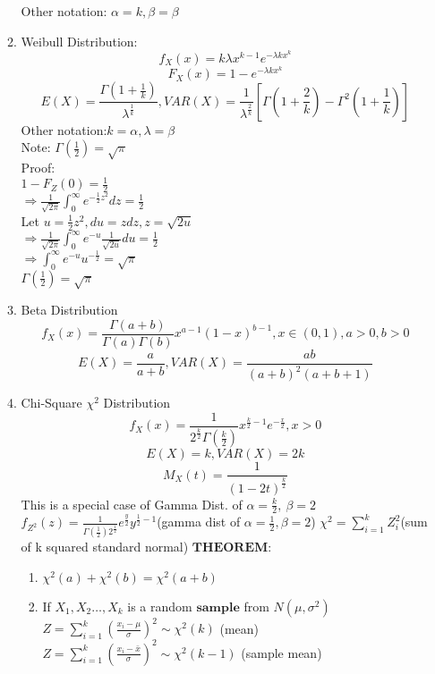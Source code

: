 \documentclass[10pt]{article}
\begin{document}
\begin{multicols}{2}
\begin{enumerate}
\begin{enumerate}
				Other notation: $\alpha = k, \beta = \beta$
				\item Weibull Distribution:\\
				$$f_X(x) = k\lambda x^{k-1}e^{-\lambda kx^k}$$
				$$F_X(x) = 1 - e^{-\lambda kx^k}$$
				$$E(X) = \frac{\Gamma(1+\frac{1}{k})}{\lambda^{\frac{1}{k}}}, VAR(X) = \frac{1}{\lambda^{\frac{2}{k}}}[\Gamma(1+\frac{2}{k}) - \Gamma^2(1+\frac{1}{k})]$$
				Other notation:$k = \alpha, \lambda = \beta$\\
				Note: $\Gamma(\frac{1}{2}) = \sqrt{\pi}$\\
				Proof:\\
				$1 - F_Z(0) = \frac{1}{2}$\\
				$\Rightarrow \frac{1}{\sqrt{2\pi}}\int_{0}^{\infty}e^{-\frac{1}{2}z^2}dz = \frac{1}{2}$\\
				Let $u = \frac{1}{2}z^2, du = zdz, z = \sqrt{2u}$\\
				$\Rightarrow \frac{1}{\sqrt{2\pi}}\int_{0}^{\infty}e^{-u}\frac{1}{\sqrt{2u}}du = \frac{1}{2}$\\
				$\Rightarrow \int_{0}^{\infty}e^{-u}u^{-\frac{1}{2}} = \sqrt{\pi}$\\
				$\Gamma(\frac{1}{2}) = \sqrt{\pi}$
				\item Beta Distribution
				$$f_X(x) = \frac{\Gamma(a + b)}{\Gamma(a)\Gamma(b)}x^{a-1}(1-x)^{b-1}, x \in (0,1), a>0, b>0$$
				$$E(X) = \frac{a}{a+b}, VAR(X) = \frac{ab}{(a+b)^2(a+b+1)}$$
				\item Chi-Square $\chi^2$ Distribution
				$$f_X(x) = \frac{1}{2^{\frac{k}{2}}\Gamma(\frac{k}{2})}x^{\frac{k}{2}-1}e^{-\frac{x}{2}}, x > 0$$
				$$E(X) = k, VAR(X) = 2k$$
				$$M_X(t) = \frac{1}{(1-2t)^{\frac{k}{2}}}$$
				This is a special case of Gamma Dist. of $\alpha = \frac{k}{2}, \ \beta = 2$\\
				$f_{Z^2}(z) = \frac{1}{\Gamma(\frac{1}{2})2^{\frac{1}{2}}}e^{\frac{y}{2}}y^{\frac{1}{2}-1}$(gamma dist of $\alpha = \frac{1}{2}, \beta = 2$)
				$\chi^2 = \sum_{i = 1}^{k}Z_i^2$(sum of k squared standard normal)
				$\textbf{THEOREM}$:
				\begin{enumerate}
					\item $\chi^2(a) + \chi^2(b) = \chi^2(a+b)$
					\item If $X_1, X_2 \dots, X_k$ is a random $\textbf{sample}$ from $N(\mu, \sigma^2)$\\
					$Z = \sum_{i = 1}^{k}(\frac{x_i-\mu}{\sigma})^2 \sim \chi^2(k)$ (mean)\\
					$Z = \sum_{i = 1}^{k}(\frac{x_i-\bar x}{\sigma})^2 \sim \chi^2(k-1)$ (sample mean)

\end{enumerate}
\end{enumerate}
\end{enumerate}
\end{multicols}
\end{document}
